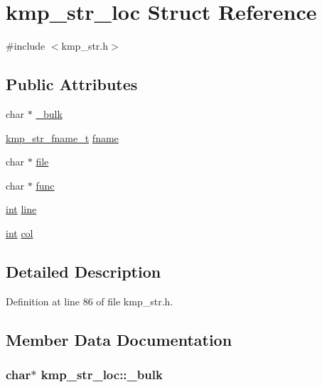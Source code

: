 \hypertarget{structkmp__str__loc}{\section{kmp\-\_\-str\-\_\-loc Struct Reference}
\label{structkmp__str__loc}
}


{\ttfamily \#include $<$kmp\-\_\-str.\-h$>$}

\subsection*{Public Attributes}
\begin{DoxyCompactItemize}
\item 
char $\ast$ \hyperlink{structkmp__str__loc_a8e863268403c45a0ddec49f8245b2157}{\-\_\-bulk}
\item 
\hyperlink{kmp__str_8h_a57b726bc025a7e36c2f2ec223145219e}{kmp\-\_\-str\-\_\-fname\-\_\-t} \hyperlink{structkmp__str__loc_a3c120d9ac1b6a294b7ff5e6015b9021f}{fname}
\item 
char $\ast$ \hyperlink{structkmp__str__loc_a58c65f1c3edba40b585cc6b00525e9e2}{file}
\item 
char $\ast$ \hyperlink{structkmp__str__loc_a92f2014d7206fbd45d62f1095fb9e575}{func}
\item 
\hyperlink{ittnotify__static_8h_a8b8dcd723308a8cb5d84277c7a3fff70}{int} \hyperlink{structkmp__str__loc_a225be91d4582b0393c41f1fbfdbea683}{line}
\item 
\hyperlink{ittnotify__static_8h_a8b8dcd723308a8cb5d84277c7a3fff70}{int} \hyperlink{structkmp__str__loc_aaee918129e8140c986d4381f85d3c6ce}{col}
\end{DoxyCompactItemize}


\subsection{Detailed Description}


Definition at line 86 of file kmp\-\_\-str.\-h.



\subsection{Member Data Documentation}
\hypertarget{structkmp__str__loc_a8e863268403c45a0ddec49f8245b2157}{
\subsubsection[{\-\_\-bulk}]{\setlength{\rightskip}{0pt plus 5cm}char$\ast$ kmp\-\_\-str\-\_\-loc\-::\-\_\-bulk}}\label{structkmp__str__loc_a8e863268403c45a0ddec49f8245b2157}



